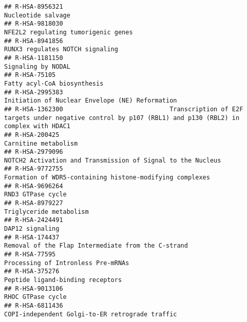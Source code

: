 \documentclass[
]{article}
\begin{document}
\begin{verbatim}
## R-HSA-8956321                                                                                                                   Nucleotide salvage
## R-HSA-9818030                                                                                                  NFE2L2 regulating tumorigenic genes
## R-HSA-8941856                                                                                                      RUNX3 regulates NOTCH signaling
## R-HSA-1181150                                                                                                                   Signaling by NODAL
## R-HSA-75105                                                                                                            Fatty acyl-CoA biosynthesis
## R-HSA-2995383                                                                                      Initiation of Nuclear Envelope (NE) Reformation
## R-HSA-1362300                             Transcription of E2F targets under negative control by p107 (RBL1) and p130 (RBL2) in complex with HDAC1
## R-HSA-200425                                                                                                                  Carnitine metabolism
## R-HSA-2979096                                                                          NOTCH2 Activation and Transmission of Signal to the Nucleus
## R-HSA-9772755                                                                             Formation of WDR5-containing histone-modifying complexes
## R-HSA-9696264                                                                                                                    RND3 GTPase cycle
## R-HSA-8979227                                                                                                              Triglyceride metabolism
## R-HSA-2424491                                                                                                                      DAP12 signaling
## R-HSA-174437                                                                                    Removal of the Flap Intermediate from the C-strand
## R-HSA-77595                                                                                                     Processing of Intronless Pre-mRNAs
## R-HSA-375276                                                                                                      Peptide ligand-binding receptors
## R-HSA-9013106                                                                                                                    RHOC GTPase cycle
## R-HSA-6811436                                                                                      COPI-independent Golgi-to-ER retrograde traffic

\end{verbatim}
\end{document}
